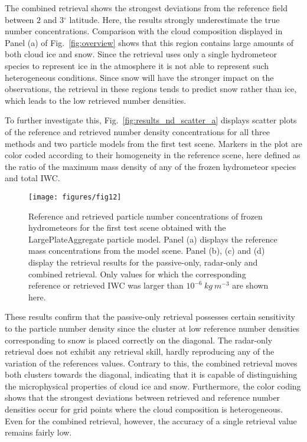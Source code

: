 \documentclass[journal abbreviation, manuscript]{copernicus}
\begin{document}
The combined retrieval shows the strongest deviations from the reference field
between $2$ and $3\unit{^\circ}$ latitude. Here, the results strongly
underestimate the true number concentrations. Comparison with the cloud
composition displayed in Panel (a) of Fig.~\ref{fig:overview} shows that this
region contains large amounts of both cloud ice and snow. Since the retrieval
uses only a single hydrometeor species to represent ice in the atmosphere it is
not able to represent such heterogeneous conditions. Since snow will have the
stronger impact on the observations, the retrieval in these regions tends to
predict snow rather than ice, which leads to the low retrieved number densities.

To further investigate this, Fig.~\ref{fig:results_nd_scatter_a} displays
scatter plots of the reference and retrieved number density concentrations for
all three methods and two particle models from the first test scene. Markers in
the plot are color coded according to their homogeneity in the reference scene,
here defined as the ratio of the maximum mass density of any of the frozen
hydrometeor species and total IWC. 

\begin{figure}
\centering
\texttt{[image: figures/fig12]}
\caption{Reference and retrieved particle number concentrations of frozen
  hydrometeors for the first test scene obtained with the LargePlateAggregate
  particle model. Panel (a) displays the reference mass concentrations from the
  model scene. Panel (b), (c) and (d) display the retrieval results for the
  passive-only, radar-only and combined retrieval. Only values for which the corresponding
  reference or retrieved IWC was larger than  $10^{-6}\ \unit{kg\ m^{-3}}$ are shown here.}
\label{fig:results_nd_a}
\end{figure}

These results confirm that the passive-only retrieval possesses certain
sensitivity to the particle number density since the cluster at low reference
number densities corresponding to snow is placed correctly on the diagonal. The
radar-only retrieval does not exhibit any retrieval skill, hardly reproducing
any of the variation of the references values. Contrary to this, the combined
retrieval moves both clusters towards the diagonal, indicating that it is
capable of distinguishing the microphysical properties of cloud ice and snow.
Furthermore, the color coding shows that the strongest deviations between
retrieved and reference number densities occur for grid points where the cloud
composition is heterogeneous. Even for the combined retrieval, however, the
accuracy of a single retrieval value remains fairly low.
\end{document}
